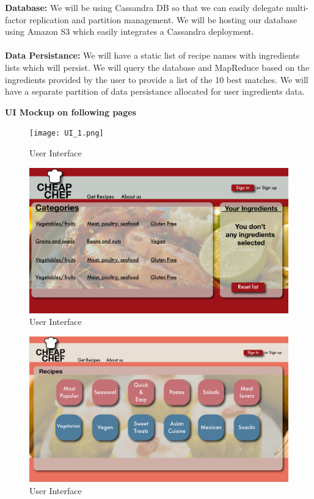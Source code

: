 \documentclass[12pt]{article}
\begin{document}
\newpage
\textbf{Database: } We will be using Cassandra DB so that we can easily delegate multi-factor replication and partition management. We will be hosting our database using
Amazon S3 which easily integrates a Cassandra deployment. \\
\vspace{1cm} \\
\textbf{Data Persistance: } We will have a static list of recipe names with ingredients lists which will persist. We will query the database and MapReduce based on the ingredients
provided by the user to provide a list of the 10 best matches. We will have a separate partition of data persistance allocated for user ingredients data. \\


\begin{center}
  \textbf{UI Mockup on following pages}
\end{center}

\newpage
\begin{figure}
  \texttt{[image: UI\_1.png]}
  \caption{User Interface}
  \label{fig: UI_1}
\end{figure}
\begin{figure}
  \includegraphics[width=\linewidth]{UI_2.png}
  \caption{User Interface}
  \label{fig: UI_2}
\end{figure}
\begin{figure}
  \includegraphics[width=\linewidth]{UI_3.png}
  \caption{User Interface}
  \label{fig: UI_3}
\end{figure}
\end{document}
